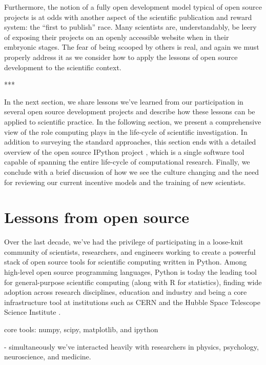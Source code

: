 \documentclass[ChapterTOCs,krantz2]{krantz} %
\newcommand{\parasep}{\begin{center}*\hspace{6em}*\hspace{6em}*\end{center}}
\begin{document}
Furthermore, the notion of a fully open development model typical
of open source projects is at odds with another aspect of the
scientific publication and reward system: the ``first
to publish'' race. Many scientists are, understandably,
be leery of exposing their projects on an openly accessible website
when in their embryonic stages. The fear of being scooped by others
is real, and again we must properly address it as we consider
how to apply the lessons of open source development to the scientific
context.



\parasep

In the next section, we share lessons we've learned from our participation in
several open source development projects and describe how these lessons can be
applied to scientific practice.  In the following section, we present a
comprehensive view of the role computing plays in the life-cycle of scientific
investigation.  In addition to surveying the standard approaches, this section
ends with a detailed overview of the open source IPython project
\cite{PER-GRA:2007}, which is a single software tool capable of spanning the
entire life-cycle of computational research.  Finally, we conclude with a brief
discussion of how we see the culture changing and the need for reviewing our
current incentive models and the training of new scientists.

\section{Lessons from open source}\label{lessons-oss}

Over the last decade, we've had the privilege of participating in a loose-knit
community of scientists, researchers, and engineers working to create a powerful
stack of open source tools for scientific computing written in Python.  Among
high-level open source programming languages, Python is today the leading tool
for general-purpose scientific computing (along with R for statistics),
finding wide adoption across research disciplines, education and industry and
being a core infrastructure tool at institutions such as CERN and the Hubble
Space Telescope Science Institute
\cite{millman2011python,Perez2011,ganga09,SST}.


core tools: numpy, scipy, matplotlib, and ipython

- simultaneously we've interacted heavily with researchers in
physics, psychology, neuroscience, and medicine.
\end{document}
